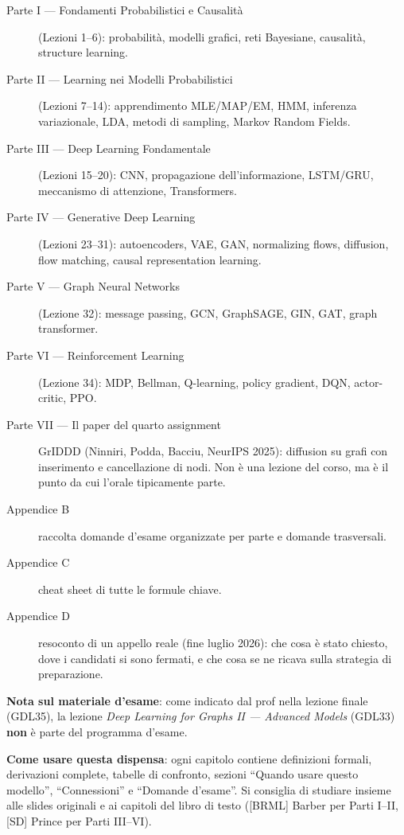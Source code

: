 \documentclass[11pt,a4paper,openany]{book}
\theoremstyle{definition}
\begin{document}
\begin{description}
  \item[Parte I — Fondamenti Probabilistici e Causalità] (Lezioni 1–6): probabilità, modelli grafici, reti Bayesiane, causalità, structure learning.
  \item[Parte II — Learning nei Modelli Probabilistici] (Lezioni 7–14): apprendimento MLE/MAP/EM, HMM, inferenza variazionale, LDA, metodi di sampling, Markov Random Fields.
  \item[Parte III — Deep Learning Fondamentale] (Lezioni 15–20): CNN, propagazione dell'informazione, LSTM/GRU, meccanismo di attenzione, Transformers.
  \item[Parte IV — Generative Deep Learning] (Lezioni 23–31): autoencoders, VAE, GAN, normalizing flows, diffusion, flow matching, causal representation learning.
  \item[Parte V — Graph Neural Networks] (Lezione 32): message passing, GCN, GraphSAGE, GIN, GAT, graph transformer.
  \item[Parte VI — Reinforcement Learning] (Lezione 34): MDP, Bellman, Q-learning, policy gradient, DQN, actor-critic, PPO.
  \item[Parte VII — Il paper del quarto assignment] GrIDDD (Ninniri, Podda, Bacciu, NeurIPS 2025): diffusion su grafi con inserimento e cancellazione di nodi. Non è una lezione del corso, ma è il punto da cui l'orale tipicamente parte.
  \item[Appendice B] raccolta domande d'esame organizzate per parte e domande trasversali.
  \item[Appendice C] cheat sheet di tutte le formule chiave.
  \item[Appendice D] resoconto di un appello reale (fine luglio 2026): che cosa è stato chiesto, dove i candidati si sono fermati, e che cosa se ne ricava sulla strategia di preparazione.
\end{description}

\textbf{Nota sul materiale d'esame}: come indicato dal prof nella lezione finale (GDL35), la lezione \emph{Deep Learning for Graphs II — Advanced Models} (GDL33) \textbf{non} è parte del programma d'esame.

\textbf{Come usare questa dispensa}: ogni capitolo contiene definizioni formali, derivazioni complete, tabelle di confronto, sezioni ``Quando usare questo modello'', ``Connessioni'' e ``Domande d'esame''. Si consiglia di studiare insieme alle slides originali e ai capitoli del libro di testo ([BRML] Barber per Parti I–II, [SD] Prince per Parti III–VI).
\end{document}
